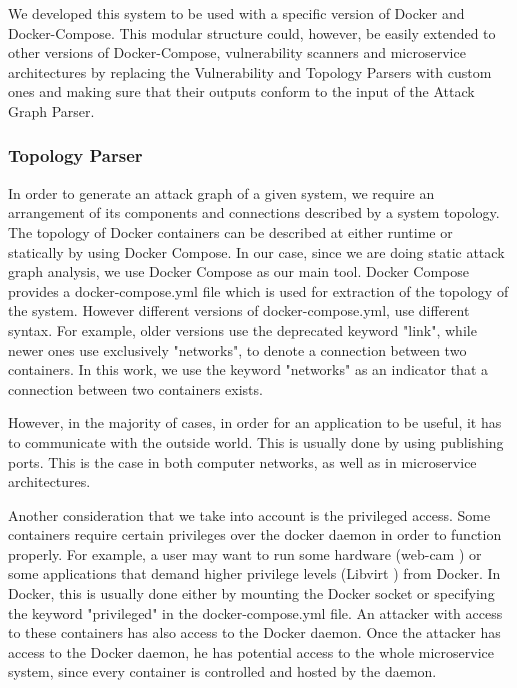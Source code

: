 We developed this system to be used with a specific version of Docker and Docker-Compose. This modular structure could, however, be easily extended to other versions of Docker-Compose, vulnerability scanners and microservice architectures by replacing the Vulnerability and Topology Parsers with custom ones and making sure that their outputs conform to the input of the Attack Graph Parser.

\subsubsection{Topology Parser}
\label{chap:topology_p}

In order to generate an attack graph of a given system, we require an arrangement of its components and connections described by a system topology. The topology of Docker containers can be described at either runtime or statically by using Docker Compose. In our case, since we are doing static attack graph analysis, we use Docker Compose as our main tool. Docker Compose provides a docker-compose.yml file which is used for extraction of the topology of the system. However different versions of docker-compose.yml, use different syntax. For example, older versions use the deprecated keyword "link", while newer ones use exclusively "networks", to denote a connection between two containers. In this work, we use the keyword "networks" as an indicator that a connection between two containers exists.

However, in the majority of cases, in order for an application to be useful, it has to communicate with the outside world. This is usually done by using publishing ports. This is the case in both computer networks, as well as in microservice architectures.

Another consideration that we take into account is the privileged access. Some containers require certain privileges over the docker daemon in order to function properly. For example, a user may want to run some hardware (web-cam \cite{webcam}) or some applications that demand higher privilege levels (Libvirt \cite{libvirt}) from Docker. In Docker, this is usually done either by mounting the Docker socket or specifying the keyword "privileged" in the docker-compose.yml file. An attacker with access to these containers has also access to the Docker daemon. Once the attacker has access to the Docker daemon, he has potential access to the whole microservice system, since every container is controlled and hosted by the daemon.

